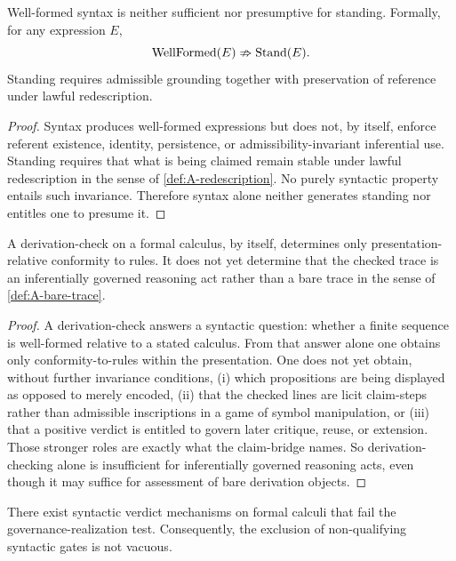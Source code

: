 \begin{theorem}
\label{thm:A-syntax-standing}
Well-formed syntax is neither sufficient nor presumptive for standing. Formally, for any expression $E$,
\[
\mathrm{WellFormed}(E) \nRightarrow \mathrm{Stand}(E).
\]
Standing requires admissible grounding together with preservation of reference under lawful redescription.
\end{theorem}

\begin{proof}
Syntax produces well-formed expressions but does not, by itself, enforce referent existence, identity, persistence, or admissibility-invariant inferential use. Standing requires that what is being claimed remain stable under lawful redescription in the sense of \cref{def:A-redescription}. No purely syntactic property entails such invariance. Therefore syntax alone neither generates standing nor entitles one to presume it.
\end{proof}

\begin{lemma}
\label{lem:A-check-not-enough}
A derivation-check on a formal calculus, by itself, determines only presentation-relative conformity to rules. It does not yet determine that the checked trace is an inferentially governed reasoning act rather than a bare trace in the sense of \cref{def:A-bare-trace}.
\end{lemma}

\begin{proof}
A derivation-check answers a syntactic question: whether a finite sequence is well-formed relative to a stated calculus. From that answer alone one obtains only conformity-to-rules within the presentation. One does not yet obtain, without further invariance conditions, (i) which propositions are being displayed as opposed to merely encoded, (ii) that the checked lines are licit claim-steps rather than admissible inscriptions in a game of symbol manipulation, or (iii) that a positive verdict is entitled to govern later critique, reuse, or extension. Those stronger roles are exactly what the claim-bridge names. So derivation-checking alone is insufficient for inferentially governed reasoning acts, even though it may suffice for assessment of bare derivation objects.
\end{proof}

\begin{theorem}
\label{thm:A-nonvacuity}
There exist syntactic verdict mechanisms on formal calculi that fail the governance-realization test. Consequently, the exclusion of non-qualifying syntactic gates is not vacuous.
\end{theorem}

